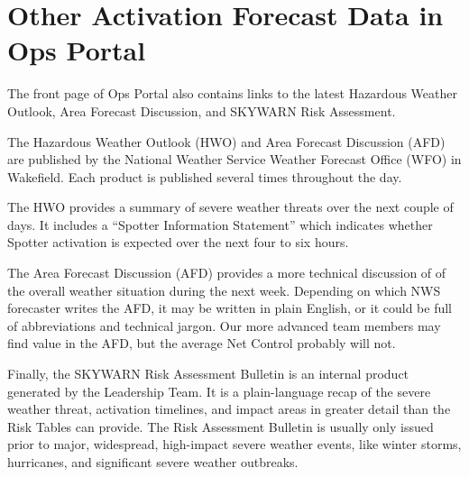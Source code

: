 \documentclass[pdflatex,letterpaper,twoside,12pt]{book}
\begin{document}

\section{Other Activation Forecast Data in Ops Portal}

The front page of Ops Portal also contains links to the latest Hazardous Weather Outlook, Area Forecast Discussion, and SKYWARN Risk Assessment.

The Hazardous Weather Outlook (HWO) and Area Forecast Discussion (AFD) are published by the National Weather Service Weather Forecast Office (WFO) in Wakefield.  Each product is published several times throughout the day.

The HWO provides a summary of severe weather threats over the next couple of days.  It includes a ``Spotter Information Statement'' which indicates whether Spotter activation is expected over the next four to six hours.


The Area Forecast Discussion (AFD) provides a more technical discussion of of the overall weather situation during the next week.  Depending on which NWS forecaster writes the AFD, it may be written in plain English, or it could be full of abbreviations and technical jargon.  Our more advanced team members may find value in the AFD, but the average Net Control probably will not.

Finally, the SKYWARN Risk Assessment Bulletin is an internal product generated by the Leadership Team.  It is a plain-language recap of the severe weather threat, activation timelines, and impact areas in greater detail than the Risk Tables can provide.  The Risk Assessment Bulletin is usually only issued prior to major, widespread, high-impact severe weather events, like winter storms, hurricanes, and significant severe weather outbreaks.
\end{document}
